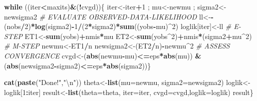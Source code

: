 \documentclass[]{article}
\newenvironment{Shaded}{\begin{snugshade}}{\end{snugshade}}
\newcommand{\CharTok}[1]{\textcolor[rgb]{0.31,0.60,0.02}{#1}}
\newcommand{\CommentTok}[1]{\textcolor[rgb]{0.56,0.35,0.01}{\textit{#1}}}
\newcommand{\ControlFlowTok}[1]{\textcolor[rgb]{0.13,0.29,0.53}{\textbf{#1}}}
\newcommand{\DataTypeTok}[1]{\textcolor[rgb]{0.13,0.29,0.53}{#1}}
\newcommand{\DecValTok}[1]{\textcolor[rgb]{0.00,0.00,0.81}{#1}}
\newcommand{\KeywordTok}[1]{\textcolor[rgb]{0.13,0.29,0.53}{\textbf{#1}}}
\newcommand{\NormalTok}[1]{#1}
\newcommand{\OperatorTok}[1]{\textcolor[rgb]{0.81,0.36,0.00}{\textbf{#1}}}
\newcommand{\StringTok}[1]{\textcolor[rgb]{0.31,0.60,0.02}{#1}}
\begin{document}
\begin{Shaded}
\begin{Highlighting}[]
  \ControlFlowTok{while}\NormalTok{ ((iter}\OperatorTok{<}\NormalTok{maxits)}\OperatorTok{&}\NormalTok{(}\OperatorTok{!}\NormalTok{cvgd))\{}
\NormalTok{  iter<-iter}\OperatorTok{+}\DecValTok{1}\NormalTok{ ; mu<-newmu ; sigma2<-newsigma2}
  \CommentTok{# EVALUATE OBSERVED-DATA-LIKELIHOOD}
\NormalTok{  ll<-}\OperatorTok{-}\NormalTok{(nobs}\OperatorTok{/}\DecValTok{2}\NormalTok{)}\OperatorTok{*}\KeywordTok{log}\NormalTok{(sigma2)}\OperatorTok{-}\DecValTok{1}\OperatorTok{/}\NormalTok{(}\DecValTok{2}\OperatorTok{*}\NormalTok{sigma2)}\OperatorTok{*}\KeywordTok{sum}\NormalTok{((yobs}\OperatorTok{-}\NormalTok{mu)}\OperatorTok{^}\DecValTok{2}\NormalTok{)}
\NormalTok{  loglik[iter]<-ll}
  \CommentTok{# E-STEP}
\NormalTok{  ET1<-}\KeywordTok{sum}\NormalTok{(yobs)}\OperatorTok{+}\NormalTok{nmis}\OperatorTok{*}\NormalTok{mu}
\NormalTok{  ET2<-}\KeywordTok{sum}\NormalTok{(yobs}\OperatorTok{^}\DecValTok{2}\NormalTok{)}\OperatorTok{+}\NormalTok{nmis}\OperatorTok{*}\NormalTok{(sigma2}\OperatorTok{+}\NormalTok{mu}\OperatorTok{^}\DecValTok{2}\NormalTok{)}
  \CommentTok{# M-STEP}
\NormalTok{  newmu<-ET1}\OperatorTok{/}\NormalTok{n}
\NormalTok{  newsigma2<-(ET2}\OperatorTok{/}\NormalTok{n)}\OperatorTok{-}\NormalTok{newmu}\OperatorTok{^}\DecValTok{2}
  \CommentTok{# ASSESS CONVERGENCE}
\NormalTok{  cvgd<-(}\KeywordTok{abs}\NormalTok{(newmu}\OperatorTok{-}\NormalTok{mu)}\OperatorTok{<=}\NormalTok{eps}\OperatorTok{*}\KeywordTok{abs}\NormalTok{(mu)) }\OperatorTok{&}\StringTok{ }\NormalTok{(}\KeywordTok{abs}\NormalTok{(newsigma2}\OperatorTok{-}\NormalTok{sigma2)}\OperatorTok{<=}\NormalTok{eps}\OperatorTok{*}\KeywordTok{abs}\NormalTok{(sigma2))\}}
  
  \KeywordTok{cat}\NormalTok{(}\KeywordTok{paste}\NormalTok{(}\StringTok{"Done!"}\NormalTok{,}\StringTok{"}\CharTok{\textbackslash{}n}\StringTok{"}\NormalTok{))}
\NormalTok{  theta<-}\KeywordTok{list}\NormalTok{(}\DataTypeTok{mu=}\NormalTok{newmu, }\DataTypeTok{sigma2=}\NormalTok{newsigma2)}
\NormalTok{  loglik<-loglik[}\DecValTok{1}\OperatorTok{:}\NormalTok{iter]}
\NormalTok{  result<-}\KeywordTok{list}\NormalTok{(}\DataTypeTok{theta=}\NormalTok{theta, }\DataTypeTok{iter=}\NormalTok{iter, }\DataTypeTok{cvgd=}\NormalTok{cvgd,}\DataTypeTok{loglik=}\NormalTok{loglik)}
\NormalTok{  result\}}
\end{Highlighting}
\end{Shaded}
\end{document}
